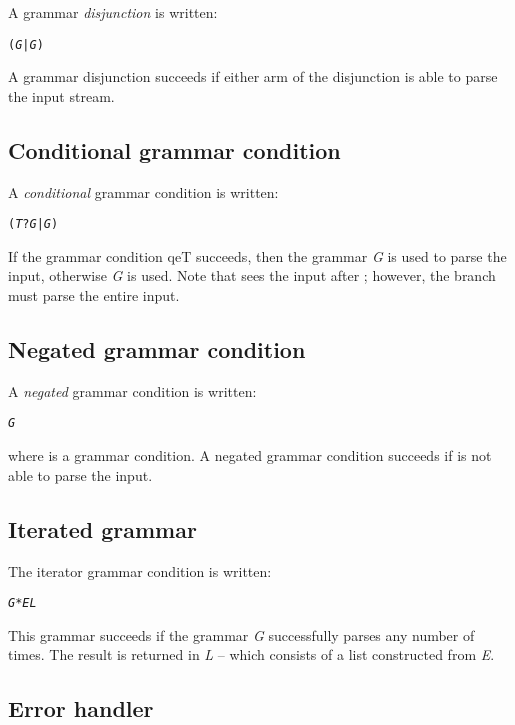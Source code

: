 A grammar \emph{disjunction} is written:
\begin{alltt}
( \emph{G} | \emph{G} )
\end{alltt}
A grammar disjunction succeeds if either arm of the disjunction is able to parse the input stream.

\subsection{Conditional grammar condition}
\label{grammar:conditional}

A \emph{conditional} grammar condition is written:
\begin{alltt}
(\emph{T}?\emph{G}|\emph{G})
\end{alltt}
If the grammar condition qe{T} succeeds, then the grammar \emph{G} is used to parse the input, otherwise \emph{G} is used. Note that  sees the input after ; however, the  branch must parse the entire input.

\subsection{Negated grammar condition}
\label{grammar:negation}

A \emph{negated} grammar condition is written:
\begin{alltt}
\nasf{} \emph{G}
\end{alltt}
where  is a grammar condition. A negated grammar condition succeeds if  is not able to parse the input.

\subsection{Iterated grammar}
\label{grammar:iterator}

The iterator grammar condition is written:
\begin{alltt}
\emph{G} * \emph{E} \uphat \emph{L}
\end{alltt}
This grammar succeeds if the grammar \emph{G} successfully parses any number of times. The result is returned in \emph{L} -- which consists of a list constructed from \emph{E}.

\subsection{Error handler}
\label{grammar:errorhandler}

